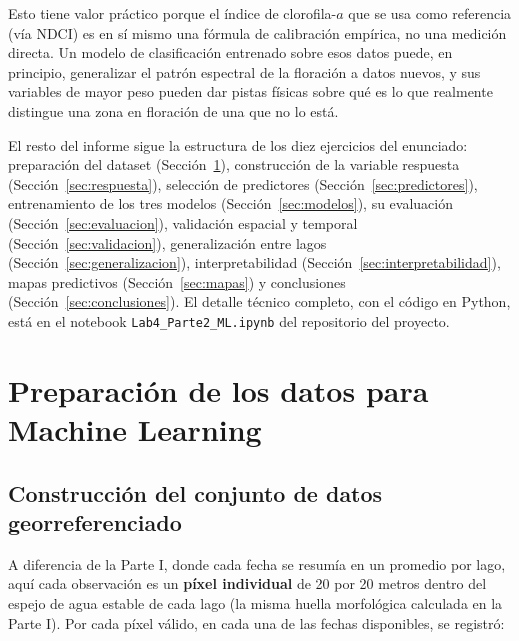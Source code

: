\documentclass[11pt]{article}
\begin{document}
Esto tiene valor práctico porque el índice de clorofila-\(a\) que se usa como referencia (v\'ia NDCI) es en sí mismo una fórmula de calibración empírica, no una medición directa. Un modelo de clasificación entrenado sobre esos datos puede, en principio, generalizar el patrón espectral de la floración a datos nuevos, y sus variables de mayor peso pueden dar pistas físicas sobre qué es lo que realmente distingue una zona en floración de una que no lo está.

El resto del informe sigue la estructura de los diez ejercicios del enunciado: preparación del dataset (Sección~\ref{sec:datos}), construcción de la variable respuesta (Sección~\ref{sec:respuesta}), selección de predictores (Sección~\ref{sec:predictores}), entrenamiento de los tres modelos (Sección~\ref{sec:modelos}), su evaluación (Sección~\ref{sec:evaluacion}), validación espacial y temporal (Sección~\ref{sec:validacion}), generalización entre lagos (Sección~\ref{sec:generalizacion}), interpretabilidad (Sección~\ref{sec:interpretabilidad}), mapas predictivos (Sección~\ref{sec:mapas}) y conclusiones (Sección~\ref{sec:conclusiones}). El detalle técnico completo, con el código en Python, está en el notebook \texttt{Lab4\_Parte2\_ML.ipynb} del repositorio del proyecto.

\section{Preparación de los datos para Machine Learning}
\label{sec:datos}

\subsection{Construcción del conjunto de datos georreferenciado}

A diferencia de la Parte I, donde cada fecha se resumía en un promedio por lago, aquí cada observación es un \textbf{píxel individual} de 20 por 20 metros dentro del espejo de agua estable de cada lago (la misma huella morfológica calculada en la Parte I). Por cada píxel válido, en cada una de las fechas disponibles, se registró:
\end{document}
